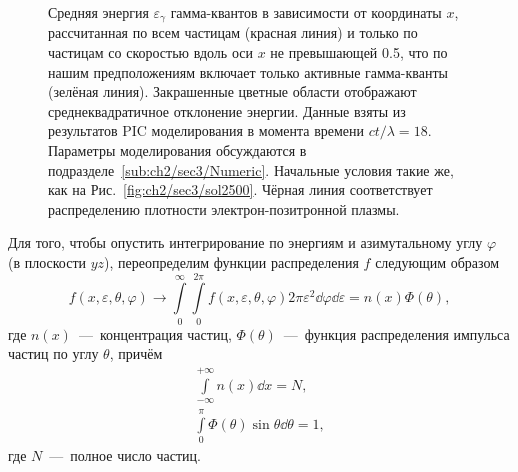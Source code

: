 \begin{figure}[ht]
    \caption[Сравнение ширины разброса энергий всех гамма-квантов и только активных гамма-квантов]{\label{fig:ch2/sec3/gamma_energy} 
    Средняя энергия $\varepsilon_\gamma$ гамма-квантов в зависимости от координаты $x$, рассчитанная по всем частицам (красная линия) и только по частицам со скоростью вдоль оси  $x$ не превышающей 0.5, что по нашим предположениям включает только активные гамма-кванты (зелёная линия). Закрашенные цветные области отображают среднеквадратичное отклонение энергии. Данные взяты из результатов PIC моделирования в момента времени $ct/\lambda=18$. Параметры моделирования обсуждаются в подразделе~\ref{sub:ch2/sec3/Numeric}. Начальные условия такие же, как на Рис.~\ref{fig:ch2/sec3/sol2500}. Чёрная линия соответствует распределению плотности электрон-позитронной плазмы.}
\end{figure}

Для того, чтобы опустить интегрирование по энергиям и азимутальному углу $\varphi$ (в плоскости $yz$), переопределим функции распределения $f$ следующим образом
\begin{equation}
    f(x, \varepsilon, \theta, \varphi) \rightarrow \int\limits_0^\infty\int\limits_0^{2\pi}f(x,\varepsilon,\theta,\varphi)2\pi\varepsilon^2\dd\varphi \dd\varepsilon = n(x)\Phi(\theta),
\end{equation}
где $n(x)$~---~концентрация частиц, $\Phi(\theta)$~---~функция распределения импульса частиц по углу $\theta$, причём
\begin{align}
    \int\limits_{-\infty}^{+\infty} n(x)\dd x = N, \\
    \int\limits_0^\pi \Phi(\theta)\sin\theta \dd\theta = 1,
\end{align}
где $N$~---~полное число частиц.

